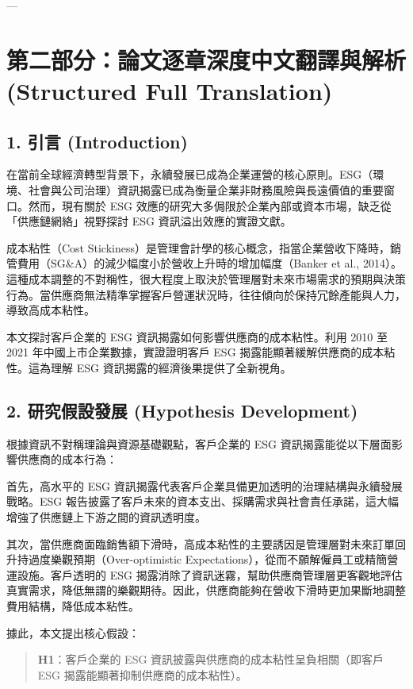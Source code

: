 \documentclass[11pt,a4paper]{article}
\begin{document}
---

\section{第二部分：論文逐章深度中文翻譯與解析 (Structured Full Translation)}

\subsection{1. 引言 (Introduction)}
在當前全球經濟轉型背景下，永續發展已成為企業運營的核心原則。ESG（環境、社會與公司治理）資訊揭露已成為衡量企業非財務風險與長遠價值的重要窗口。然而，現有關於 ESG 效應的研究大多侷限於企業內部或資本市場，缺乏從「供應鏈網絡」視野探討 ESG 資訊溢出效應的實證文獻。

成本粘性（Cost Stickiness）是管理會計學的核心概念，指當企業營收下降時，銷管費用（SG\&A）的減少幅度小於營收上升時的增加幅度（Banker et al., 2014）。這種成本調整的不對稱性，很大程度上取決於管理層對未來市場需求的預期與決策行為。當供應商無法精準掌握客戶營運狀況時，往往傾向於保持冗餘產能與人力，導致高成本粘性。

本文探討客戶企業的 ESG 資訊揭露如何影響供應商的成本粘性。利用 2010 至 2021 年中國上市企業數據，實證證明客戶 ESG 揭露能顯著緩解供應商的成本粘性。這為理解 ESG 資訊揭露的經濟後果提供了全新視角。

\subsection{2. 研究假設發展 (Hypothesis Development)}
根據資訊不對稱理論與資源基礎觀點，客戶企業的 ESG 資訊揭露能從以下層面影響供應商的成本行為：

首先，高水平的 ESG 資訊揭露代表客戶企業具備更加透明的治理結構與永續發展戰略。ESG 報告披露了客戶未來的資本支出、採購需求與社會責任承諾，這大幅增強了供應鏈上下游之間的資訊透明度。

其次，當供應商面臨銷售額下滑時，高成本粘性的主要誘因是管理層對未來訂單回升持過度樂觀預期（Over-optimistic Expectations），從而不願解僱員工或精簡營運設施。客戶透明的 ESG 揭露消除了資訊迷霧，幫助供應商管理層更客觀地評估真實需求，降低無謂的樂觀期待。因此，供應商能夠在營收下滑時更加果斷地調整費用結構，降低成本粘性。

據此，本文提出核心假設：
\begin{quote}
\textbf{H1}：客戶企業的 ESG 資訊披露與供應商的成本粘性呈負相關（即客戶 ESG 揭露能顯著抑制供應商的成本粘性）。
\end{quote}
\end{document}
